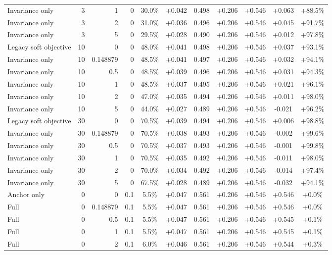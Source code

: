 \begin{table}[htbp]
\begin{tabular}{lrrrccccccc}
Invariance only & 3 & 1 & 0 & 30.0\% & +0.042 & 0.498 & +0.206 & +0.546 & +0.063 & +88.5\% \\
Invariance only & 3 & 2 & 0 & 31.0\% & +0.036 & 0.496 & +0.206 & +0.546 & +0.045 & +91.7\% \\
Invariance only & 3 & 5 & 0 & 29.5\% & +0.028 & 0.490 & +0.206 & +0.546 & +0.012 & +97.8\% \\
Legacy soft objective & 10 & 0 & 0 & 48.0\% & +0.041 & 0.498 & +0.206 & +0.546 & +0.037 & +93.1\% \\
Invariance only & 10 & 0.148879 & 0 & 48.5\% & +0.041 & 0.497 & +0.206 & +0.546 & +0.032 & +94.1\% \\
Invariance only & 10 & 0.5 & 0 & 48.5\% & +0.039 & 0.496 & +0.206 & +0.546 & +0.031 & +94.3\% \\
Invariance only & 10 & 1 & 0 & 48.5\% & +0.037 & 0.495 & +0.206 & +0.546 & +0.021 & +96.1\% \\
Invariance only & 10 & 2 & 0 & 47.0\% & +0.035 & 0.494 & +0.206 & +0.546 & +0.011 & +98.0\% \\
Invariance only & 10 & 5 & 0 & 44.0\% & +0.027 & 0.489 & +0.206 & +0.546 & -0.021 & +96.2\% \\
Legacy soft objective & 30 & 0 & 0 & 70.5\% & +0.039 & 0.494 & +0.206 & +0.546 & +0.006 & +98.8\% \\
Invariance only & 30 & 0.148879 & 0 & 70.5\% & +0.038 & 0.493 & +0.206 & +0.546 & -0.002 & +99.6\% \\
Invariance only & 30 & 0.5 & 0 & 70.5\% & +0.037 & 0.493 & +0.206 & +0.546 & -0.001 & +99.8\% \\
Invariance only & 30 & 1 & 0 & 70.5\% & +0.035 & 0.492 & +0.206 & +0.546 & -0.011 & +98.0\% \\
Invariance only & 30 & 2 & 0 & 70.0\% & +0.034 & 0.492 & +0.206 & +0.546 & -0.014 & +97.4\% \\
Invariance only & 30 & 5 & 0 & 67.5\% & +0.028 & 0.489 & +0.206 & +0.546 & -0.032 & +94.1\% \\
Anchor only & 0 & 0 & 0.1 & 5.5\% & +0.047 & 0.561 & +0.206 & +0.546 & +0.546 & +0.0\% \\
Full & 0 & 0.148879 & 0.1 & 5.5\% & +0.047 & 0.561 & +0.206 & +0.546 & +0.546 & +0.0\% \\
Full & 0 & 0.5 & 0.1 & 5.5\% & +0.047 & 0.561 & +0.206 & +0.546 & +0.545 & +0.1\% \\
Full & 0 & 1 & 0.1 & 5.5\% & +0.047 & 0.561 & +0.206 & +0.546 & +0.545 & +0.1\% \\
Full & 0 & 2 & 0.1 & 6.0\% & +0.046 & 0.561 & +0.206 & +0.546 & +0.544 & +0.3\% \\

\end{tabular}
\end{table}
